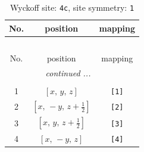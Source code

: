 \documentclass[fleqn,8pt]{jsarticle}
\begin{document}
\begin{longtable}{ccc}
\caption{Wyckoff site: {\tt 4c}, site symmetry: {\tt 1}}
 \\
 \hline \hline
No. & position & mapping \\ \hline \endfirsthead

\multicolumn{2}{l}{\tablename\ \thetable{}} \\
 \hline \hline
No. & position & mapping \\ \hline \endhead

 \hline \hline
\multicolumn{2}{r}{\footnotesize\it continued ...} \\ \endfoot

 \hline \hline
\multicolumn{2}{r}{} \\ \endlastfoot

1 & $\left[ x,\, y,\, z \right]$ & {\tt [1]} \\ \hline
2 & $\left[ x,\, - y,\, z + \frac{1}{2} \right]$ & {\tt [2]} \\ \hline
3 & $\left[ x,\, y,\, z + \frac{1}{2} \right]$ & {\tt [3]} \\ \hline
4 & $\left[ x,\, - y,\, z \right]$ & {\tt [4]} \\
\end{longtable}
\end{document}
